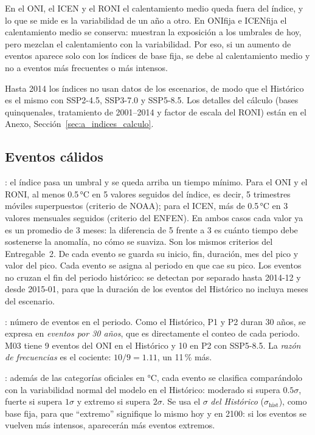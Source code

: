 \documentclass[11pt,a4paper]{article}
\begin{document}
En el ONI, el ICEN y el RONI el calentamiento medio queda fuera del índice, y lo que se mide es la variabilidad de un año a otro.
En ONIfija e ICENfija el calentamiento medio se conserva: muestran la exposición a los umbrales de hoy, pero mezclan el calentamiento con la variabilidad.
Por eso, si un aumento de eventos aparece solo con los índices de base fija, se debe al calentamiento medio y no a eventos más frecuentes o más intensos.

Hasta 2014 los índices no usan datos de los escenarios, de modo que el Histórico es el mismo con SSP2-4.5, SSP3-7.0 y SSP5-8.5.
Los detalles del cálculo (bases quinquenales, tratamiento de 2001--2014 y factor de escala del RONI) están en el Anexo, Sección~\ref{sec:a_indices_calculo}.

\subsection{Eventos cálidos}
\label{sec:eventos}

: el índice pasa un umbral y se queda arriba un tiempo mínimo.
Para el ONI y el RONI, al menos 0.5\,°C en 5 valores seguidos del índice, es decir, 5 trimestres móviles superpuestos (criterio de NOAA); para el ICEN, más de 0.5\,°C en 3 valores mensuales seguidos (criterio del ENFEN).
En ambos casos cada valor ya es un promedio de 3 meses: la diferencia de 5 frente a 3 es cuánto tiempo debe sostenerse la anomalía, no cómo se suaviza.
Son los mismos criterios del Entregable~2.
De cada evento se guarda su inicio, fin, duración, mes del pico y valor del pico.
Cada evento se asigna al periodo en que cae su pico.
Los eventos no cruzan el fin del periodo histórico: se detectan por separado hasta 2014-12 y desde 2015-01, para que la duración de los eventos del Histórico no incluya meses del escenario.

: número de eventos en el periodo.
Como el Histórico, P1 y P2 duran 30 años, se expresa en \emph{eventos por 30 años}, que es directamente el conteo de cada periodo.
M03 tiene 9 eventos del ONI en el Histórico y 10 en P2 con SSP5-8.5.
La \emph{razón de frecuencias} es el cociente: $10/9 = 1.11$, un 11\,\% más.

: además de las categorías oficiales en °C, cada evento se clasifica comparándolo con la variabilidad normal del modelo en el Histórico: moderado si supera $0.5\sigma$, fuerte si supera $1\sigma$ y extremo si supera $2\sigma$.
Se usa el $\sigma$ \emph{del Histórico} ($\sigma_{\mathrm{hist}}$), como base fija, para que ``extremo'' signifique lo mismo hoy y en 2100: si los eventos se vuelven más intensos, aparecerán más eventos extremos.
\end{document}
